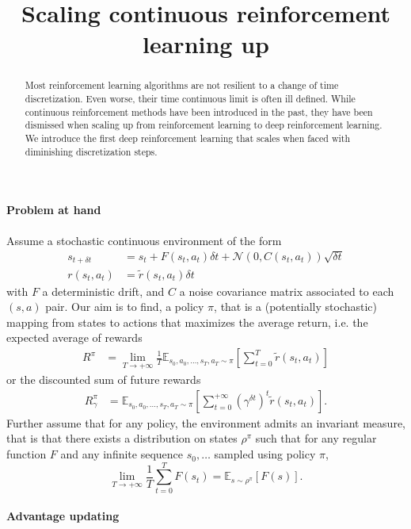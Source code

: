 \documentclass[11pt]{article}
\title{Scaling continuous reinforcement learning up}
\newcommand{\deltat}{{\delta t}}
\newcommand{\gauss}{\mathcal{N}}
\newcommand{\E}{\mathbb{E}}
\begin{document}
\maketitle
\begin{abstract}
	Most reinforcement learning algorithms are not resilient to a change of
	time discretization. Even worse, their time continuous limit is often
	ill defined.  While continuous reinforcement methods have been
	introduced in the past, they have been dismissed when scaling up from
	reinforcement learning to deep reinforcement learning. We introduce the
	first deep reinforcement learning that scales when faced with
	diminishing discretization steps.
\end{abstract}
\paragraph{Problem at hand}
Assume a stochastic continuous environment of the form
\begin{align}
	s_{t+\deltat} &= s_t + F(s_t, a_t) \deltat + \gauss(0, C(s_t, a_t)) \sqrt{\deltat}\\
	r(s_t, a_t) &= \tilde{r}(s_t, a_t) \deltat
\end{align}
with $F$ a deterministic drift, and $C$ a noise covariance matrix
associated to each $(s, a)$ pair. Our aim is to find, a policy $\pi$, that is a
(potentially stochastic) mapping from states to actions that maximizes the
average return, i.e. the expected average of rewards
\begin{align}
	R^\pi &= \lim\limits_{T\to+\infty}
	\frac{1}{T}
	\E_{s_0, a_0, \ldots, s_T, a_T\sim\pi}\left[
		\sum\limits_{t = 0}^T \tilde{r}(s_t, a_t)
	\right]
\end{align}
or the discounted sum of future rewards
\begin{align}
	R^\pi_\gamma &= \E_{s_0, a_0, \ldots, s_T, a_T \sim \pi}
	\left[
		\sum\limits_{t=0}^{+\infty}
		(\gamma^\deltat)^t \tilde{r}(s_t, a_t) 
	\right].
\end{align}
Further assume that for any policy, the environment admits an invariant
measure, that is that there exists a distribution on states $\rho^\pi$ such that for
any regular function $F$ and any infinite sequence $s_0, \ldots$ sampled using policy
$\pi$,
\begin{equation}
	\lim\limits_{T\to+\infty}
	\frac{1}{T}
	\sum\limits_{t=0}^T F(s_t) =
	\E_{s\sim \rho^\pi}\left[
		F(s)
	\right].
\end{equation}
\paragraph{Advantage updating}
\end{document}
